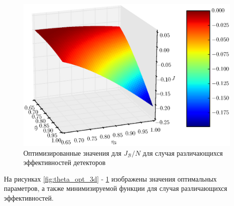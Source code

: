 \documentclass[%
master,         %
subf,           %
href,           %
,times         %
]{disser}
\numberwithin{equation}{section}
\numberwithin{figure}{section}
\begin{document}
\begin{figure}[t]
\includegraphics[scale=0.7]{J3d.eps}
\caption{Оптимизированные значения для $J_{\mathcal{B}}/N$ для случая различающихся эффективностей детекторов}
\label{fig:J_opt_3d}
\end{figure}

На рисунках \ref{fig:theta_opt_3d} - \ref{fig:J_opt_3d} изображены значения оптимальных параметров, а также минимизируемой функции для случая различающихся эффективностей.

\begingroup
\small
\end{document}
